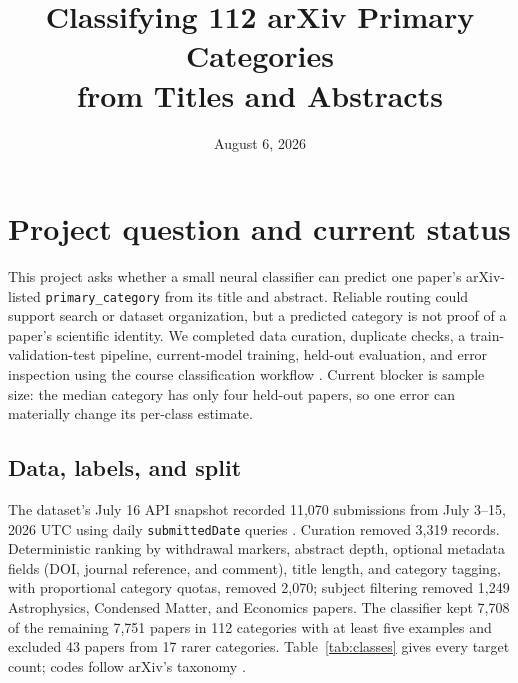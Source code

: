 \documentclass[10pt]{article}
\title{\vspace{-2.1em}\textbf{Classifying 112 arXiv Primary Categories\\
from Titles and Abstracts}}
\author{\makebox[\dimexpr\textwidth-2\tabcolsep\relax][l]{\hspace*{1.00in}\small Gary Zhang, Sanvi Inturi,
  Elaine Harris-Stapleton, Agastya Iyengar \qquad \textsc{AI Bootcamp}}}
\date{\normalsize August 6, 2026}
\begin{document}
\maketitle
\vspace{-1.7em}

\section{Project question and current status}

This project asks whether a small neural classifier can predict one paper's
arXiv-listed \texttt{primary\_category} from its title and abstract.
Reliable routing could support search or dataset organization, but a predicted
category is not proof of a paper's scientific identity. We completed data
curation, duplicate checks, a train-validation-test pipeline, current-model
training, held-out evaluation, and error inspection using the course
classification workflow \cite{course}. Current blocker is sample size: the
median category has only four held-out papers, so one error can materially
change its per-class estimate.

\subsection{Data, labels, and split}

The dataset's July 16 API snapshot recorded 11,070 submissions from July
3--15, 2026 UTC using daily \texttt{submittedDate} queries \cite{arxivapi}. Curation removed
3,319 records. Deterministic ranking by withdrawal markers, abstract depth,
optional metadata fields (DOI, journal reference, and comment), title length,
and category tagging, with proportional
category quotas, removed 2,070; subject filtering removed 1,249 Astrophysics,
Condensed Matter, and Economics papers. The classifier kept 7,708 of the
remaining 7,751 papers in 112 categories with at least five examples and
excluded 43 papers from 17 rarer categories. Table~\ref{tab:classes} gives
every target count; codes follow arXiv's taxonomy \cite{taxonomy}.
\end{document}
